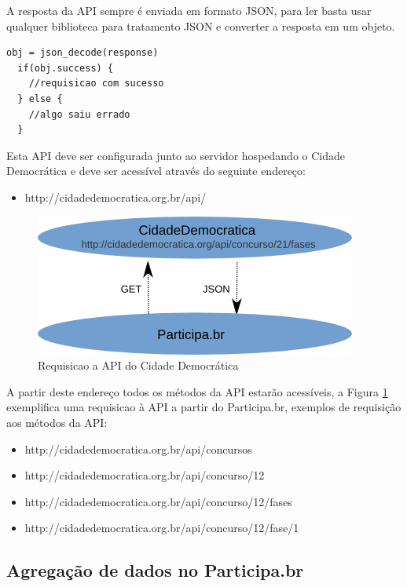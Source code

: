 \documentclass[12pt]{article}
\begin{document}
A resposta da API sempre é enviada em formato JSON, para ler basta usar
qualquer biblioteca para tratamento JSON e converter a resposta em um objeto.

\begin{framed}
\begin{lstlisting}[caption=Pseudo-código com exemplo de como tratar o retorno JSON]
  obj = json_decode(response)
  if(obj.success) {
    //requisicao com sucesso
  } else {
    //algo saiu errado
  }
\end{lstlisting}
\end{framed}

Esta API deve ser configurada junto ao servidor hospedando o Cidade
Democrática e deve ser acessível através do seguinte endereço:

\begin{itemize}
  \item http://cidadedemocratica.org.br/api/
\end{itemize}

\begin{figure}[h]
\center
\includegraphics[scale=0.5]{diagrama.png}
\caption{Requisicao a API do Cidade Democrática}
\label{diagrama}
\end{figure}

A partir deste endereço todos os métodos da API estarão acessíveis, a Figura
\ref{diagrama} exemplifica uma requisicao à API a partir do Participa.br,
exemplos de requisição aos métodos da API:

\begin{itemize}
  \item http://cidadedemocratica.org.br/api/concursos
  \item http://cidadedemocratica.org.br/api/concurso/12
  \item http://cidadedemocratica.org.br/api/concurso/12/fases
  \item http://cidadedemocratica.org.br/api/concurso/12/fase/1
\end{itemize}

\subsection{Agregação de dados no Participa.br}
\end{document}
